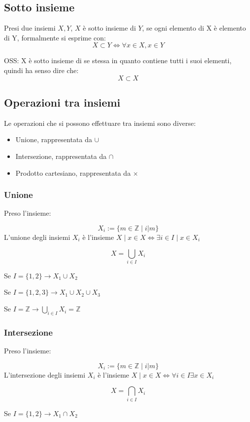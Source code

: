 \documentclass[a4paper,12pt]{article}
\begin{document}
	\subsection{Sotto insieme}
	Presi due insiemi $X, Y$, $X$ è sotto insieme di $Y$, se ogni elemento di X è elemento di Y, formalmente si esprime con:
	\[
	X \subset Y \iff \forall x \in X, x \in Y
	\]
	
	OSS: X è sotto insieme di se stessa in quanto contiene tutti i suoi elementi, quindi ha senso dire che:
	\[
	X \subset X
	\]
	
	\subsection{Operazioni tra insiemi}
	Le operazioni che si possono effettuare tra insiemi sono diverse:
	\begin{itemize}
		\item Unione, rappresentata da $\cup$
		\item Intersezione, rappresentata da $\cap$
		\item Prodotto cartesiano, rappresentata da $\times$
	\end{itemize}
	
	\subsubsection{Unione}
	Preso l'insieme:
	 
	\[
	X_i := \{m \in \mathbb{Z} \mid i | m\}
	\]
	L'unione degli insiemi $X_i$ è l'insieme $X \mid x\in X \iff \exists i \in I \mid x \in X_i$
	
	\[
	X = \bigcup_{i \in I} X_i
	\]
	
	Se $I = \{1, 2\} \rightarrow X_1 \cup X_2$
	
	Se $I = \{1, 2, 3\} \rightarrow X_1 \cup X_2 \cup X_3$
		
	Se $\displaystyle I = \mathbb{Z} \rightarrow \bigcup_{i \in I} X_i = \mathbb{Z}$
	
	\subsubsection{Intersezione}
	Preso l'insieme:
	
	\[
	X_i := \{m \in \mathbb{Z} \mid i | m\}
	\]
	L'intersezione degli insiemi $X_i$ è l'insieme $X \mid x\in X \iff \forall i \in I \exists x \in X_i$
	
	\[
	X = \bigcap_{i \in I} X_i
	\]
	
	Se $I = \{1, 2\} \rightarrow X_1 \cap X_2$
	
\end{document}
